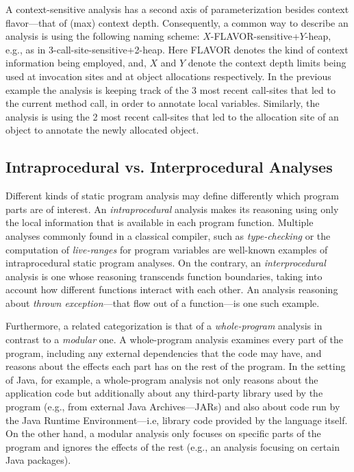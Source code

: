 A context-sensitive analysis has a second axis of parameterization besides
context flavor---that of (max) context depth. Consequently, a common way to
describe an analysis is using the following naming scheme:
$X$-FLAVOR-sensitive+$Y$-heap, e.g., as in 3-call-site-sensitive+2-heap. Here
FLAVOR denotes the kind of context information being employed, and, $X$ and
$Y$ denote the context depth limits being used at invocation sites and at
object allocations respectively. In the previous example the analysis is
keeping track of the 3 most recent call-sites that led to the current
method call, in order to annotate local variables. Similarly, the analysis is
using the 2 most recent call-sites that led to the allocation site of an
object to annotate the newly allocated object.


\subsection{Intraprocedural vs. Interprocedural Analyses}

Different kinds of static program analysis may define differently which program
parts are of interest. An \emph{intraprocedural} analysis makes its reasoning
using only the local information that is available in each program function.
Multiple analyses commonly found in a classical compiler, such as
\emph{type-checking} or the computation of \emph{live-ranges} for program
variables are well-known examples of intraprocedural static program analyses.
On the contrary, an \emph{interprocedural} analysis is one whose reasoning
transcends function boundaries, taking into account how different functions
interact with each other. An analysis reasoning about \emph{thrown
exception}---that flow out of a function---is one such example.

Furthermore, a related categorization is that of a \emph{whole-program}
analysis in contrast to a \emph{modular} one. A whole-program analysis examines
every part of the program, including any external dependencies that the code
may have, and reasons about the effects each part has on the rest of the
program. In the setting of Java, for example, a whole-program analysis not only
reasons about the application code but additionally about any third-party
library used by the program (e.g., from external Java Archives---JARs) and also
about code run by the Java Runtime Environment---i.e, library code provided by
the language itself. On the other hand, a modular analysis only focuses on
specific parts of the program and ignores the effects of the rest (e.g., an
analysis focusing on certain Java packages).

